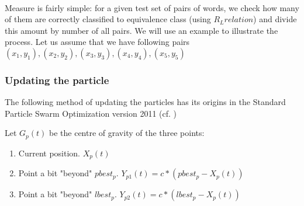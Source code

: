 \documentclass[runningheads,a4paper]{llncs}
\begin{document}
\paragraph{}
Measure is fairly simple: for a given test set of pairs of words, we check how many of them are correctly classified to equivalence class (using $R_{L} relation$) and divide this amount by number of all pairs. We will use an example to illustrate the process.
Let us assume that we have following pairs ${(x_1,y_1), (x_2,y_2), (x_3, y_3), (x_4, y_4), (x_5, y_5)} $


\subsubsection{Updating the particle}




%	

The following method of updating the particles has its origins in the Standard Particle Swarm Optimization version 2011 (cf. \cite{pso_11})

Let $G_p(t)$ be the centre of gravity of the three points:
\begin{enumerate}
	\item Current position. $X_p(t)$
	
	\item Point a bit "beyond" $pbest_p$. $Y_{p1}(t) = c*(pbest_p-X_p(t))$
	
	\item Point a bit "beyond" $lbest_p$. $Y_{p2}(t) = c*(lbest_p-X_p(t))$
			
\end{enumerate}
\end{document}
